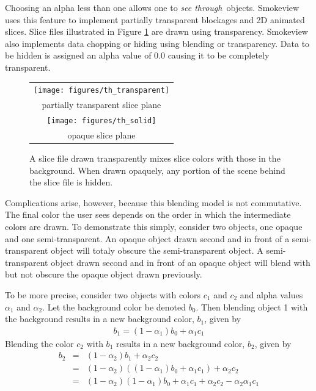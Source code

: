 \documentclass[11pt,twoside]{book}
\newcommand{\figoptions}{htp}
\begin{document}
Choosing an alpha less than one allows one to {\em see through}\
objects. Smokeview uses this feature to implement partially
transparent blockages and 2D animated slices. Slice files
illustrated in Figure \ref{figtransparent} are drawn using
transparency. Smokeview also implements data chopping or hiding
using blending or transparency.  Data to be hidden is assigned an
alpha value of 0.0 causing it to be completely transparent.

\begin{figure}[\figoptions]
\begin{center}
\begin{tabular}{c}
\texttt{[image: figures/th\_transparent]}\\
partially transparent slice plane\\
\texttt{[image: figures/th\_solid]}\\
opaque slice plane\\
\end{tabular}
\end{center}
\caption {A slice file drawn transparently mixes
slice colors with those in the background.  When drawn opaquely,
any portion of the scene behind the slice file is hidden. }
\label{figtransparent}
\end{figure}

Complications arise, however, because this blending model is not commutative.  The final color the user sees depends on the order in which the intermediate colors are drawn. To demonstrate this simply, consider two objects, one opaque and one semi-transparent.  An opaque object drawn second and in front of a semi-transparent object will totaly obscure the semi-transparent object. A semi-transparent object drawn second and in front of an opaque object will blend with but not obscure the opaque object drawn previously.

To be more precise, consider two objects with colors $c_1$ and $c_2$ and alpha values $\alpha_1$ and $\alpha_2$.   Let the background color be denoted $b_0$.  Then blending object 1 with the background results in a new background color, $b_1$, given by
\begin{eqnarray*}
b_1=(1-\alpha_1)b_0 + \alpha_1c_1
\end{eqnarray*}
Blending the color $c_2$ with $b_1$ results in a new background color, $b_2$, given by
\begin{eqnarray*}
b_2&=&(1-\alpha_2)b_1 + \alpha_2c_2\\
&=&(1-\alpha_2)((1-\alpha_1)b_0 + \alpha_1c_1)+\alpha_2c_2\\
&=&(1-\alpha_2)(1-\alpha_1)b_0 + \alpha_1c_1 + \alpha_2c_2 - \alpha_2\alpha_1c_1
\end{eqnarray*}
\end{document}
